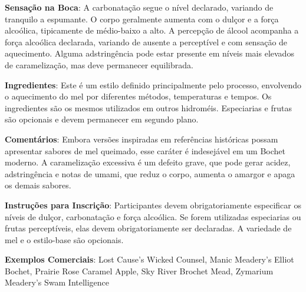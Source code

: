 \textbf{Sensação na Boca}: A carbonatação segue o nível declarado, variando de tranquilo a espumante. O corpo geralmente aumenta com o dulçor e a força alcoólica, tipicamente de médio-baixo a alto. A percepção de álcool acompanha a força alcoólica declarada, variando de ausente a perceptível e com sensação de aquecimento. Alguma adstringência pode estar presente em níveis mais elevados de caramelização, mas deve permanecer equilibrada.

\textbf{Ingredientes}: Este é um estilo definido principalmente pelo processo, envolvendo o aquecimento do mel por diferentes métodos, temperaturas e tempos. Os ingredientes são os mesmos utilizados em outros hidroméis. Especiarias e frutas são opcionais e devem permanecer em segundo plano.

\textbf{Comentários}: Embora versões inspiradas em referências históricas possam apresentar sabores de mel queimado, esse caráter é indesejável em um Bochet moderno. A caramelização excessiva é um defeito grave, que pode gerar acidez, adstringência e notas de umami, que reduz o corpo, aumenta o amargor e apaga os demais sabores.

\textbf{Instruções para Inscrição}: Participantes devem obrigatoriamente especificar os níveis de dulçor, carbonatação e força alcoólica. Se forem utilizadas especiarias ou frutas perceptíveis, elas devem obrigatoriamente ser declaradas. A variedade de mel e o estilo-base são opcionais.

\textbf{Exemplos Comerciais}: Lost Cause's Wicked Counsel, Manic Meadery's Elliot Bochet, Prairie Rose Caramel Apple, Sky River Brochet Mead, Zymarium Meadery's Swam Intelligence
